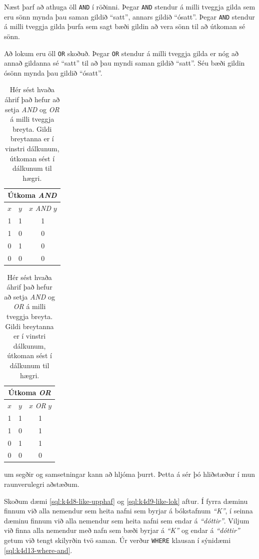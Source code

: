 Næst þarf að athuga öll \verb|AND| í röðinni. Þegar \verb|AND| stendur á milli tveggja gilda sem eru sönn mynda þau saman gildið ``satt'', annars gildið ``ósatt''. Þegar \verb|AND| stendur á milli tveggja gilda þurfa sem sagt bæði gildin að vera sönn til að útkoman sé sönn.

Að lokum eru öll \verb|OR| skoðuð. Þegar \verb|OR| stendur á milli tveggja gilda er nóg að annað gildanna sé ``satt'' til að þau myndi saman gildið ``satt''. Séu bæði gildin ósönn mynda þau gildið ``ósatt''.

\begin{table}[b]
\caption[AND og OR]{Hér sést hvaða áhrif það hefur að setja \emph{AND} og \emph{OR} á milli tveggja breyta. Gildi breytanna er í vinstri dálkunum, útkoman sést í dálkunum til hægri.}
\label{tafla:and-or}
\centering
\begin{tabular}{ccc}
\multicolumn{3}{c}{Útkoma \emph{AND}}\\
\toprule
$x$&$y$&$x$ \emph{AND} $y$\\
\midrule
1&1&1\\
1&0&0\\
0&1&0\\
0&0&0\\
\bottomrule
\end{tabular}
\hspace{1cm}
\begin{tabular}{ccc}
\multicolumn{3}{c}{Útkoma \emph{OR}}\\
\toprule
$x$&$y$&$x$ \emph{OR} $y$\\
\midrule
1&1&1\\
1&0&1\\
0&1&1\\
0&0&0\\
\bottomrule
\end{tabular}
\end{table}

 um segðir og samsetningar kann að hljóma þurrt. Þetta á sér þó hliðstæður í mun raunverulegri aðstæðum.

Skoðum dæmi \ref{sql:k4d8-like-upphaf} og \ref{sql:k4d9-like-lok} aftur. Í fyrra dæminu finnum við alla nemendur sem heita nafni sem byrjar á bókstafnum \emph{``K''}, í seinna dæminu finnum við alla nemendur sem heita nafni sem endar á \emph{``dóttir''}. Viljum við finna alla nemendur með nafn sem bæði byrjar á \emph{``K''} og endar á \emph{``dóttir''} getum við tengt skilyrðin tvö saman. Úr verður \verb|WHERE| klausan í sýnidæmi \ref{sql:k4d13-where-and}.

